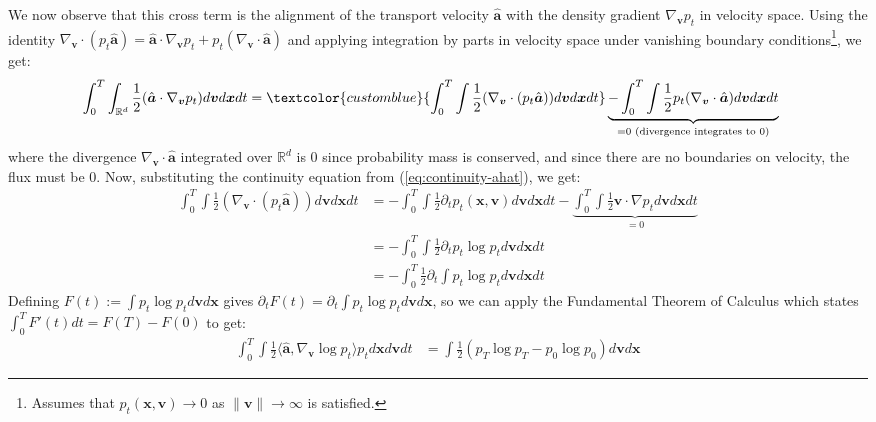 \documentclass{article}
\newcommand{\bluetext}[1]{\textcolor{customblue}{#1}}
\begin{document}
We now observe that this cross term is the alignment of the transport velocity $\hat{\boldsymbol{a}}$ with the density gradient $\nabla_{\boldsymbol{v}}p_t$ in velocity space. Using the identity $\nabla_{\boldsymbol{v}} \cdot (p_t\hat{\boldsymbol{a}})=\hat{\boldsymbol{a}}\cdot \nabla_{\boldsymbol{v}}p_t + p_t(\nabla_{\boldsymbol{v}} \cdot \hat{\boldsymbol{a}})$ and applying integration by parts in velocity space under vanishing boundary conditions\footnote{Assumes that $p_t(\boldsymbol{x}, \boldsymbol{v})\to 0$ as $\|\boldsymbol{v}\|\to \infty$ is satisfied.}, we get:
\begin{align}
    \int_0^T\int_{\mathbb{R}^d}\frac{1}{2}(\hat{\boldsymbol{a}}\cdot \nabla_{\boldsymbol{v}}p_t)d\boldsymbol{v}d\boldsymbol{x}dt&=\bluetext{\int_0^T\int\frac{1}{2}(\nabla_{\boldsymbol{v}} \cdot (p_t\hat{\boldsymbol{a}}))d\boldsymbol{v}d\boldsymbol{x}dt}\underbrace{-\int_0^T\int \frac{1}{2}p_t(\nabla_{\boldsymbol{v}} \cdot \hat{\boldsymbol{a}})d\boldsymbol{v}d\boldsymbol{x}dt}_{=0\text{ (divergence integrates to 0)}}
\end{align}
where the divergence $\nabla_{\boldsymbol{v}}\cdot \hat{\boldsymbol{a}}$ integrated over $\mathbb{R}^d$ is 0 since probability mass is conserved, and since there are no boundaries on velocity, the flux must be 0. Now, substituting the continuity equation from (\ref{eq:continuity-ahat}), we get:
\begin{align}
     \int_0^T\int\frac{1}{2}(\nabla_{\boldsymbol{v}} \cdot (p_t\hat{\boldsymbol{a}}))d\boldsymbol{v}d\boldsymbol{x}dt&=-\int_0^T\int\frac{1}{2}\partial_tp_t(\boldsymbol{x}, \boldsymbol{v})d\boldsymbol{v}d\boldsymbol{x}dt-\underbrace{\int_0^T\int\frac{1}{2}\boldsymbol{v}\cdot \nabla p_td\boldsymbol{v}d\boldsymbol{x}dt}_{= 0}\nonumber\\
     &=-\int_0^T\int\frac{1}{2}\partial_tp_t\log p_td\boldsymbol{v}d\boldsymbol{x}dt\nonumber\\
     &=-\int_0^T\frac{1}{2}\partial_t\int p_t\log p_td\boldsymbol{v}d\boldsymbol{x}dt
\end{align}
Defining $F(t):=\int p_t\log p_td\boldsymbol{v}d\boldsymbol{x}$ gives $\partial_tF(t)=\partial_t\int p_t\log p_td\boldsymbol{v}d\boldsymbol{x}$, so we can apply the Fundamental Theorem of Calculus which states $\int_0^TF'(t)dt=F(T) -F(0)$ to get:
\begin{align}
    \int_0^T\int \frac{1}{2}\langle \hat{\boldsymbol{a}}, \nabla_{\boldsymbol{v}}\log p_t\rangle p_td\boldsymbol{x}d\boldsymbol{v}dt&=\int \frac{1}{2}\left(p_T\log p_T-p_0\log p_0\right)d\boldsymbol{v}d\boldsymbol{x}
\end{align}
\end{document}
